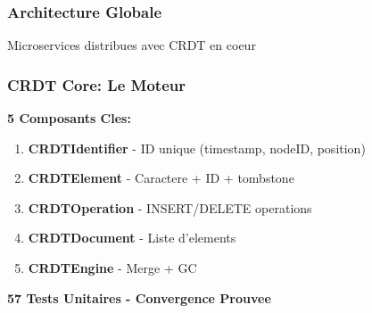 \documentclass[aspectratio=16:9]{beamer}
\begin{document}
\begin{frame}
  \frametitle{Architecture Globale}
  
  \vspace{0.5cm}
  
  \centering
  
  
  \vspace{1cm}
  
  Microservices distribues avec CRDT en coeur
\end{frame}

\begin{frame}
  \frametitle{CRDT Core: Le Moteur}
  
  \textbf{5 Composants Cles:}
  
  \begin{enumerate}
    \item \textbf{CRDTIdentifier} - ID unique (timestamp, nodeID, position)
    \item \textbf{CRDTElement} - Caractere + ID + tombstone
    \item \textbf{CRDTOperation} - INSERT/DELETE operations
    \item \textbf{CRDTDocument} - Liste d'elements
    \item \textbf{CRDTEngine} - Merge + GC
  \end{enumerate}
  
  \bigskip
  
  \centering
  
  \Large\textbf{57 Tests Unitaires - Convergence Prouvee}
\end{frame}
\end{document}
